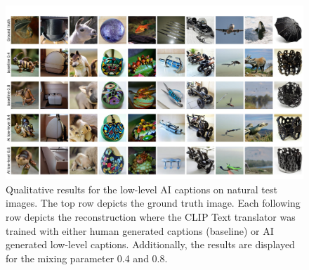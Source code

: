 \begin{figure}[ht]
    \centering
    \includegraphics[width=1\textwidth]{plots/aicap_qual_test.JPEG}
    \caption[Experiment 2: Reconstructed images for natural test images]{Qualitative results for the low-level AI captions on natural test images. The top row depicts the ground truth image. Each following row depicts the reconstruction where the CLIP Text translator was trained with either human generated captions (baseline) or AI generated low-level captions. Additionally, the results are displayed for the mixing parameter 0.4 and 0.8.}\label{fig:aicap_qual_test}
\end{figure}

